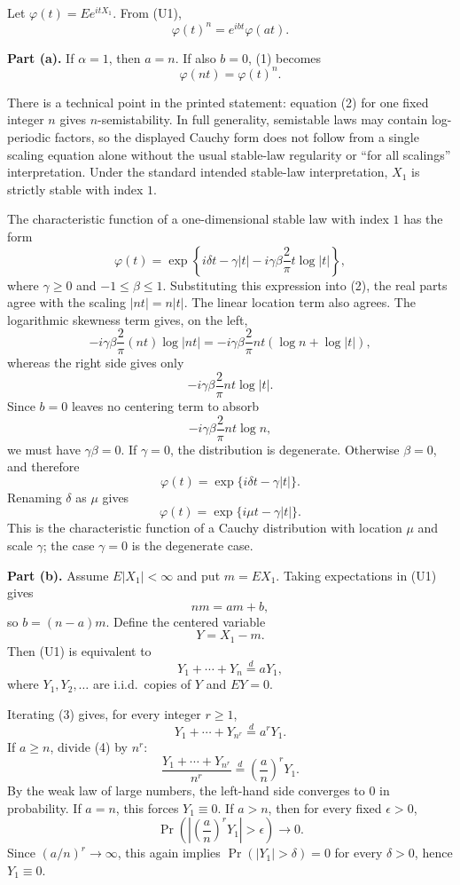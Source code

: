 \begin{solution}
Let $\varphi(t)=E e^{itX_1}$. From (U1),
\[
{\varphi(t)}^n=e^{ibt}\varphi(at). \tag{1}
\]

\textbf{Part (a).} If $\alpha=1$, then $a=n$. If also $b=0$, (1) becomes
\[
\varphi(nt)={\varphi(t)}^n. \tag{2}
\]

There is a technical point in the printed statement: equation (2) for one fixed integer $n$ gives $n$-semistability. In full generality, semistable laws may contain log-periodic factors, so the displayed Cauchy form does not follow from a single scaling equation alone without the usual stable-law regularity or ``for all scalings'' interpretation. Under the standard intended stable-law interpretation, $X_1$ is strictly stable with index $1$.

The characteristic function of a one-dimensional stable law with index $1$ has the form
\[
\varphi(t)
=\exp\left\{
i\delta t-\gamma |t|
-i\gamma\beta\frac{2}{\pi}t\log |t|
\right\},
\]
where $\gamma\geq 0$ and $-1\leq \beta\leq 1$. Substituting this expression into (2), the real parts agree with the scaling $|nt|=n|t|$. The linear location term also agrees. The logarithmic skewness term gives, on the left,
\[
-i\gamma\beta\frac{2}{\pi}(nt)\log |nt|
=-i\gamma\beta\frac{2}{\pi}nt(\log n+\log |t|),
\]
whereas the right side gives only
\[
-i\gamma\beta\frac{2}{\pi}nt\log |t|.
\]
Since $b=0$ leaves no centering term to absorb
\[
-i\gamma\beta\frac{2}{\pi}nt\log n,
\]
we must have $\gamma\beta=0$. If $\gamma=0$, the distribution is degenerate. Otherwise $\beta=0$, and therefore
\[
\varphi(t)=\exp\{i\delta t-\gamma |t|\}.
\]
Renaming $\delta$ as $\mu$ gives
\[
\boxed{\varphi(t)=\exp\{i\mu t-\gamma |t|\}.}
\]
This is the characteristic function of a Cauchy distribution with location $\mu$ and scale $\gamma$; the case $\gamma=0$ is the degenerate case.

\textbf{Part (b).} Assume $E|X_1|<\infty$ and put $m=E X_1$. Taking expectations in (U1) gives
\[
nm=am+b,
\]
so $b=(n-a)m$. Define the centered variable
\[
Y=X_1-m.
\]
Then (U1) is equivalent to
\[
Y_1+\cdots+Y_n\stackrel{d}{=}aY_1, \tag{3}
\]
where $Y_1,Y_2,\ldots$ are i.i.d.\ copies of $Y$ and $EY=0$.

Iterating (3) gives, for every integer $r\geq 1$,
\[
Y_1+\cdots+Y_{n^r}\stackrel{d}{=}a^r Y_1. \tag{4}
\]
If $a\geq n$, divide (4) by $n^r$:
\[
\frac{Y_1+\cdots+Y_{n^r}}{n^r}
\stackrel{d}{=}
{\left(\frac{a}{n}\right)}^r Y_1.
\]
By the weak law of large numbers, the left-hand side converges to $0$ in probability. If $a=n$, this forces $Y_1\equiv 0$. If $a>n$, then for every fixed $\epsilon>0$,
\[
\Pr\left(\left|{\left(\frac{a}{n}\right)}^r Y_1\right|>\epsilon\right)\to 0.
\]
Since ${(a/n)}^r\to\infty$, this again implies $\Pr(|Y_1|>\delta)=0$ for every $\delta>0$, hence $Y_1\equiv 0$.


\end{solution}
